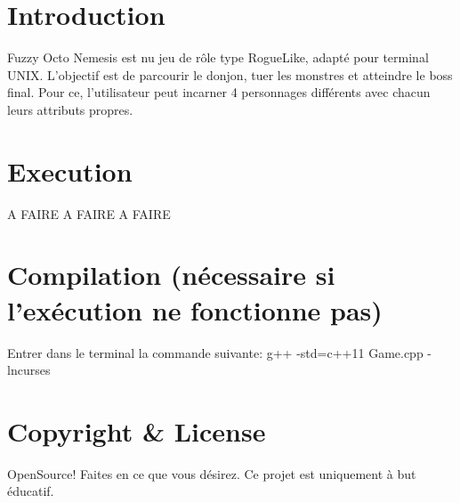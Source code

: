 \hypertarget{index_intro_sec}{}\section{Introduction}\label{index_intro_sec}
Fuzzy Octo Nemesis est nu jeu de rôle type Rogue\-Like, adapté pour terminal U\-N\-I\-X. L'objectif est de parcourir le donjon, tuer les monstres et atteindre le boss final. Pour ce, l'utilisateur peut incarner 4 personnages différents avec chacun leurs attributs propres. \hypertarget{index_install_sec}{}\section{Execution}\label{index_install_sec}
A F\-A\-I\-R\-E A F\-A\-I\-R\-E A F\-A\-I\-R\-E\hypertarget{index_tools_subsec}{}\section{Compilation (nécessaire si l'exécution ne fonctionne pas)}\label{index_tools_subsec}
Entrer dans le terminal la commande suivante\-: g++ -\/std=c++11 Game.\-cpp -\/lncurses\hypertarget{index_copyright}{}\section{Copyright \& License}\label{index_copyright}
Open\-Source! Faites en ce que vous désirez. Ce projet est uniquement à but éducatif. \par
\par
 